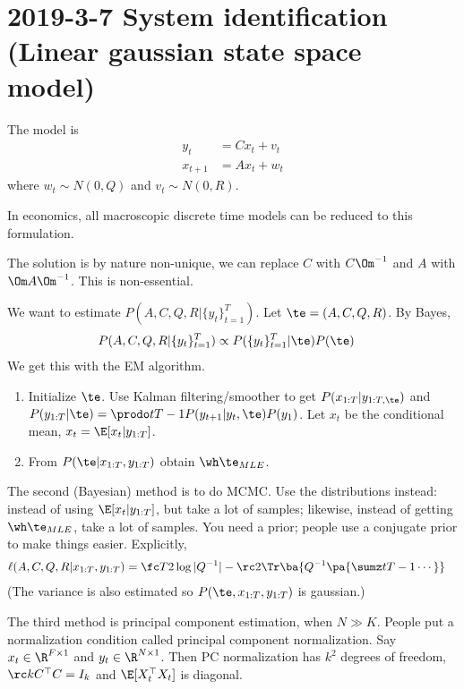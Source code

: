 \section{2019-3-7 System identification (Linear gaussian state space model)}

The model is 
\begin{align}
y_t&=Cx_t+v_t\\
x_{t+1}&=Ax_t + w_t
\end{align}
where $w_t\sim N(0,Q)$ and $v_t\sim N(0,R)$. 

In economics, all macroscopic discrete time models can be reduced to this formulation. 

The solution is by nature %
non-unique, we can replace $C$ with $C\Om^{-1}$ and $A$ with $\Om A\Om^{-1}$. This is non-essential.

We want to estimate $P(A,C,Q,R|\{y_t\}_{t=1}^T)$.  Let $\te=(A,C,Q,R)$. By Bayes,
\begin{align}
P(A,C,Q,R|\{y_t\}_{t=1}^T)
&\propto 
P(\{y_t\}_{t=1}^T|\te)P(\te)
\end{align}
We get this with the EM algorithm.
\begin{enumerate}
\item
Initialize $\te$. Use Kalman filtering/smoother to get $P(x_{1:T}|y_{1:T,\te})$  and $P(y_{1:T}|\te) = \prodo t{T-1} P(y_{t+1}|y_t,\te)P(y_1)$.
Let $x_t$ be the conditional mean, $x_t=\E[x_t|y_{1:T}]$. 
\item
From $P(\te|x_{1:T}, y_{1:T})$ obtain $\wh\te_{MLE}$.
\end{enumerate}
The second (Bayesian) method is to do MCMC. Use the distributions instead: instead of using $\E[x_t|y_{1:T}]$, but take a lot of samples; likewise, instead of getting $\wh \te_{MLE}$, take a lot of samples. You need a prior; people use a conjugate prior to make things easier. 
Explicitly,
\begin{align}
\ell(A,C,Q,R|x_{1:T},y_{1:T})
&=\fc T2 \log |Q^{-1}| - 
\rc 2 \Tr\ba{
Q^{-1}\pa{\sumz t{T-1}\cdots}
}
\end{align}
(The variance is also estimated so $P(\te,x_{1:T},y_{1:T})$ is gaussian.)

The third method is principal component estimation, when $N\gg K$. People put a normalization condition called principal component normalization.
Say $x_t\in \R^{F\times 1}$ and $y_t\in \R^{N\times 1}$. Then PC normalization has $k^2$ degrees of freedom, $\rc k C^\top C = I_k$ and $\E[X_t^\top X_t]$ is diagonal.

